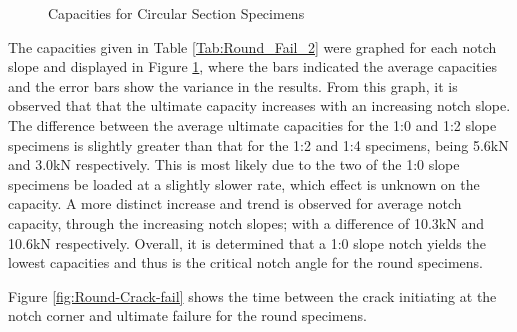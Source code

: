 \documentclass[11pt,a4paper]{article}
\numberwithin{equation}{subsection}
\begin{document}
\begin{figure}[h]
	\begin{center}
	\end{center}
	\caption{Capacities for Circular Section Specimens}
	\label{fig:Round_Spec_Cap}
\end{figure}

\noindent
The capacities given in Table \ref{Tab:Round_Fail_2} were graphed for each notch slope and displayed in Figure \ref{fig:Round_Spec_Cap}, where the bars indicated the average capacities and the error bars show the variance in the results. From this graph, it is observed that that the ultimate capacity increases with an increasing notch slope. The difference between the average ultimate capacities for the 1:0 and 1:2 slope specimens is slightly greater than that for the 1:2 and 1:4 specimens, being 5.6kN and 3.0kN respectively. This is most likely due to the two of the 1:0 slope specimens be loaded at a slightly slower rate, which effect is unknown on the capacity. A more distinct increase and trend is observed for average notch capacity, through the increasing notch slopes; with a difference of 10.3kN and 10.6kN respectively. Overall, it is determined that a 1:0 slope notch yields the lowest capacities and thus is the critical notch angle for the round specimens.

\vspace*{\baselineskip}
\noindent
Figure \ref{fig:Round-Crack-fail} shows the time between the crack initiating at the notch corner and ultimate failure for the round specimens.
\vspace*{\baselineskip}
\end{document}
